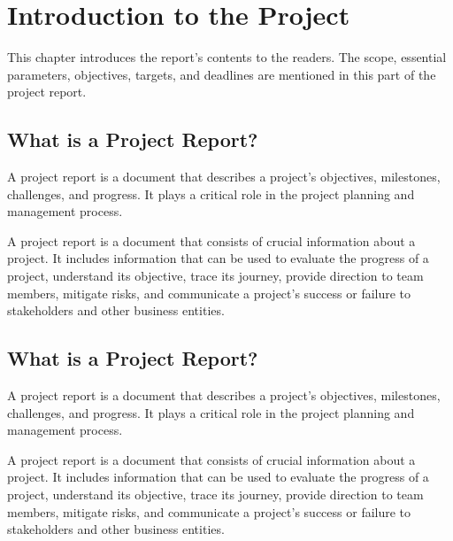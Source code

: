 \chapter{Introduction to the Project}

This chapter introduces the report’s contents to the readers. The scope, essential parameters, objectives, targets, and deadlines are mentioned in this part of the project report.



\section{What is a Project Report?}
A project report is a document that describes a project’s objectives, milestones, challenges, and progress. It plays a critical role in the project planning and management process.

A project report is a document that consists of crucial information about a project. It includes information that can be used to evaluate the progress of a project, understand its objective, trace its journey, provide direction to team members, mitigate risks, and communicate a project’s success or failure to stakeholders and other business entities. \cite{Bradshaw}

\section{What is a Project Report?}
A project report is a document that describes a project’s objectives, milestones, challenges, and progress. It plays a critical role in the project planning and management process.

A project report is a document that consists of crucial information about a project. It includes information that can be used to evaluate the progress of a project, understand its objective, trace its journey, provide direction to team members, mitigate risks, and communicate a project’s success or failure to stakeholders and other business entities. \cite{Bradshaw}